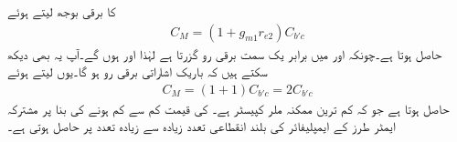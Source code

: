  کا برقی بوجھ  لیتے ہوئے
\begin{align}
C_M=\left(1+g_{m1} r_{e2} \right) C_{b'c}
\end{align}
حاصل ہوتا ہے۔چونکہ  اور  میں برابر یک سمت برقی رو  گزرتا ہے لہٰذا  اور  ہوں گے۔آپ یہ بھی دیکھ سکتے ہیں کہ باریک اشاراتی برقی رو  ہو گا۔یوں   لیتے ہوئے
\begin{align}
C_M=\left(1+1 \right) C_{b'c}=2 C_{b'c}
\end{align}
حاصل ہوتا ہے جو کہ کم ترین ممکنہ ملر کپیسٹر ہے۔ کی قیمت کم سے کم ہونے کی بنا پر مشترکہ ایمٹر        طرز کے ایمپلیفائر کی  بلند انقطاعی تعدد زیادہ سے زیادہ تعدد پر حاصل ہوتی ہے۔

